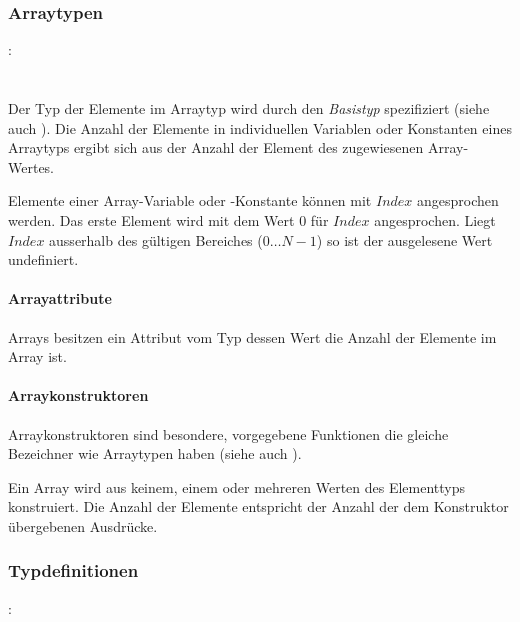 \subsubsection{Arraytypen}\label{Arraytypen}
:\label{typ_array}\\
\hspace*{1cm}\glq\Gt{[}\grq  \glq\Gt{]}\grq \\
\hspace*{1cm}\glq\Gt{[}\grq  \glq\Gt{]}\grq {} \\

Der Typ der Elemente im Arraytyp wird durch den \emph{Basistyp} spezifiziert (siehe auch ).
Die Anzahl der Elemente in individuellen Variablen oder Konstanten eines Arraytyps
ergibt sich aus der Anzahl der Element des zugewiesenen Array-Wertes.

Elemente einer Array-Variable oder -Konstante können mit \ident{Bezeichner[}$\mathit{Index}$\ident{]} angesprochen
werden. Das erste Element wird mit dem Wert $0$ für $\mathit{Index}$ angesprochen.
Liegt $\mathit{Index}$ ausserhalb des gültigen Bereiches ($0\dots{}N-1$) so ist der ausgelesene Wert
undefiniert.


\paragraph{Arrayattribute}\label{Arrayattribute}

Arrays besitzen ein Attribut  vom Typ  dessen Wert
die Anzahl der Elemente im Array ist.


\paragraph{Arraykonstruktoren}\label{Arraykonstruktoren}


Arraykonstruktoren sind besondere, vorgegebene Funktionen die gleiche Bezeichner wie Arraytypen haben
(siehe auch ).

Ein Array wird aus keinem, einem oder mehreren Werten des Elementtyps konstruiert.
Die Anzahl der Elemente entspricht der Anzahl der dem Konstruktor übergebenen Ausdrücke.

\subsubsection{Typdefinitionen}\label{Typdefinitionen}
:\label{typ_definition}\\
\hspace*{1cm}\glq{}\grq  {}   \\

